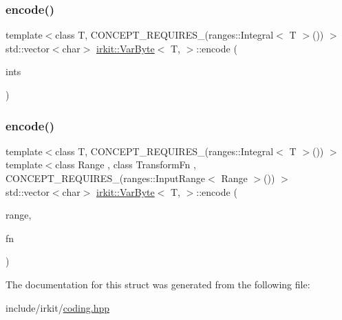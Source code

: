 \mbox{\label{structirkit_1_1VarByte_a8ac67e74ce059c904c5573cf46643ffe}} 
\subsubsection{\texorpdfstring{encode()}{encode()}\hspace{0.1cm}{\footnotesize\ttfamily [1/2]}}
{\footnotesize\ttfamily template$<$class T, C\+O\+N\+C\+E\+P\+T\+\_\+\+R\+E\+Q\+U\+I\+R\+E\+S\+\_\+(ranges\+::\+Integral$<$ T $>$()) $>$ \\
std\+::vector$<$char$>$ \hyperlink{structirkit_1_1VarByte}{irkit\+::\+Var\+Byte}$<$ T, $>$\+::encode (\begin{DoxyParamCaption}\item[{const std\+::vector$<$ T $>$ \&}]{ints }\end{DoxyParamCaption})\hspace{0.3cm}{\ttfamily [inline]}}

\mbox{\label{structirkit_1_1VarByte_a9125fe467a53a0556bd642c09d5d2d27}} 
\subsubsection{\texorpdfstring{encode()}{encode()}\hspace{0.1cm}{\footnotesize\ttfamily [2/2]}}
{\footnotesize\ttfamily template$<$class T, C\+O\+N\+C\+E\+P\+T\+\_\+\+R\+E\+Q\+U\+I\+R\+E\+S\+\_\+(ranges\+::\+Integral$<$ T $>$()) $>$ \\
template$<$class Range , class Transform\+Fn , C\+O\+N\+C\+E\+P\+T\+\_\+\+R\+E\+Q\+U\+I\+R\+E\+S\+\_\+(ranges\+::\+Input\+Range$<$ Range $>$()) $>$ \\
std\+::vector$<$char$>$ \hyperlink{structirkit_1_1VarByte}{irkit\+::\+Var\+Byte}$<$ T, $>$\+::encode (\begin{DoxyParamCaption}\item[{const Range \&}]{range,  }\item[{Transform\+Fn}]{fn }\end{DoxyParamCaption})\hspace{0.3cm}{\ttfamily [inline]}}



The documentation for this struct was generated from the following file\+:\begin{DoxyCompactItemize}
\item 
include/irkit/\hyperlink{coding_8hpp}{coding.\+hpp}\end{DoxyCompactItemize}
